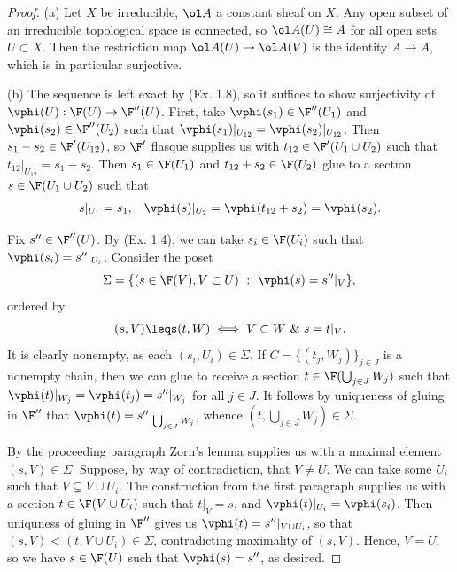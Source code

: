 \documentclass[12pt]{amsart}
\begin{document}
\begin{proof}
  (a) Let $X$ be irreducible, $\ol A$ a constant sheaf on $X$.
  Any open subset of an irreducible topological space is connected, so $\ol A(U) \cong A$ for all open sets $U\subset X$.
  Then the restriction map $\ol A(U)\to \ol A(V)$ is the identity $A\to A$, which is in particular surjective.

  (b) The sequence is left exact by (Ex. 1.8), so it suffices to show surjectivity of $\vphi(U):\F(U)\to \F''(U)$.
  First, take $\vphi(s_1)\in \F''(U_1)$ and $\vphi(s_2)\in \F''(U_2)$ such that $\vphi(s_1)|_{U_{12}}=\vphi(s_2)|_{U_{12}}$.
  Then $s_1-s_2\in\F'(U_{12})$, so $\F'$ flasque supplies us with $t_{12}\in \F'(U_1\cup U_2)$ such that $t_{12}|_{U_{12}}=s_1-s_2$.
  Then $s_1\in \F(U_1)$ and $t_{12}+s_2\in \F(U_2)$ glue to a section $s\in \F(U_1\cup U_2)$ such that 
  \begin{align*}
    &s|_{U_1} =s_1,
    &\vphi(s)|_{U_2} =\vphi(t_{12}+s_2) =\vphi(s_2).
  \end{align*}

  Fix $s''\in \F''(U)$.
  By (Ex. 1.4), we can take $s_i\in \F(U_i)$ such that $\vphi(s_i)=s''|_{U_i}$.
  Consider the poset
  \[
    \Sigma = \{(s\in \F(V),V\subset U) ~:~ \vphi(s)= s''|_V\}, \\
  \] 
  ordered by
  \begin{align*}
    (s,V)\leqs (t,W) \iff V\subset W~\&~ s=t|_V.
  \end{align*}
  It is clearly nonempty, as each $(s_i,U_i)\in \Sigma$.
  If $C=\{(t_j,W_j)\}_{j\in J}$ is a nonempty chain, then we can glue to receive a section $t\in \F(\bigcup_{j\in J}W_j)$ such that $\vphi(t)|_{W_j}=\vphi(t_j)=s''|_{W_j}$ for all $j\in J$.
  It follows by uniqueness of gluing in $\F''$ that $\vphi(t)=s''|_{\bigcup_{j\in J}W_j}$, whence $(t,\bigcup_{j\in J}W_j)\in \Sigma$.

  By the proceeding paragraph Zorn's lemma supplies us with a maximal element $(s,V)\in \Sigma$.
  Suppose, by way of contradiction, that $V\neq U$.
  We can take some $U_i$ such that $V\subsetneq V\cup U_i$.
  The construction from the first paragraph supplies us with a section $t\in \F(V\cup U_i)$ such that $t|_V= s$, and $\vphi(t)|_{U_i}=\vphi(s_i)$.
  Then uniquness of gluing in $\F''$ gives us $\vphi(t)=s''|_{V\cup U_i}$, so that $(s,V)<(t,V\cup U_i)\in \Sigma$, contradicting maximality of $(s,V)$.
  Hence, $V=U$, so we have $s\in \F(U)$ such that $\vphi(s)= s''$, as desired.


\end{proof}
\end{document}

